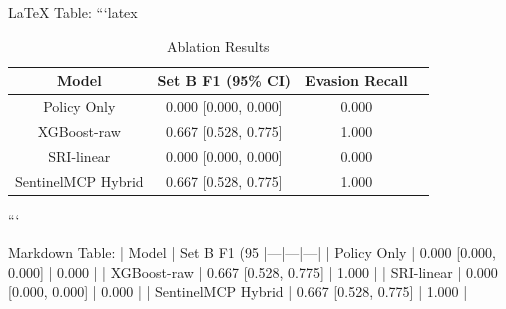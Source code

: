 LaTeX Table:
```latex
\begin{table}[htbp]
\caption{Ablation Results}
\begin{center}
\begin{tabular}{|c|c|c|c|}
\hline
\textbf{Model} & \textbf{Set B F1 (95\% CI)} & \textbf{Evasion Recall} \\
\hline
Policy Only & 0.000 [0.000, 0.000] & 0.000 \\
\hline
XGBoost-raw & 0.667 [0.528, 0.775] & 1.000 \\
\hline
SRI-linear & 0.000 [0.000, 0.000] & 0.000 \\
\hline
SentinelMCP Hybrid & 0.667 [0.528, 0.775] & 1.000 \\
\hline
\end{tabular}
\end{center}
\end{table}
```

Markdown Table:
| Model | Set B F1 (95%
|---|---|---|
| Policy Only | 0.000 [0.000, 0.000] | 0.000 |
| XGBoost-raw | 0.667 [0.528, 0.775] | 1.000 |
| SRI-linear | 0.000 [0.000, 0.000] | 0.000 |
| SentinelMCP Hybrid | 0.667 [0.528, 0.775] | 1.000 |
